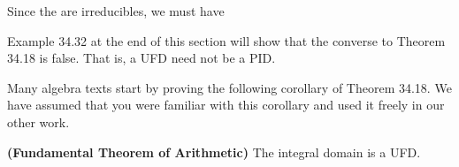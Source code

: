 \documentclass[11pt,oneside]{article}
\begin{document}
\begin{BookBody}
\noindent Since the  are irreducibles, we must have  \BookEnd{\blacklozenge}

Example 34.32 at the end of this section will show that the converse to Theorem 34.18 is false. That is, a UFD need not be a PID.

Many algebra texts start by proving the following corollary of Theorem 34.18. We have assumed that you were familiar with this corollary and used it freely in our other work.

 \textbf{(Fundamental Theorem of Arithmetic)} The integral domain  is a UFD.

\end{BookBody}

\BookNarrativetrue
\end{document}
